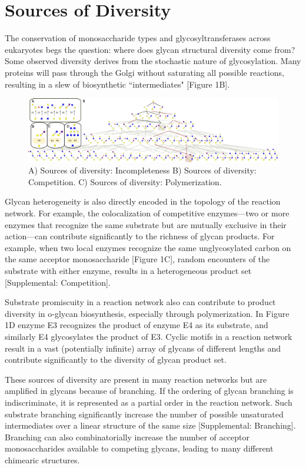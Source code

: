 \documentclass[twocolumn]{article}
\begin{document}
\section*{Sources of Diversity}
The conservation of monosaccharide types and glycosyltransferases across eukaryotes begs the question: where does glycan structural diversity come from? Some observed diversity derives from the stochastic nature of glycosylation.  Many proteins will pass through the Golgi without saturating all possible reactions, resulting in a slew of biosynthetic ``intermediates" [Figure 1B].  

\begin{figure}
    \includegraphics[width=\textwidth]{Figure_2.pdf}
	\caption{A) Sources of diversity: Incompleteness B) Sources of diversity: Competition. C) Sources of diversity: Polymerization.}
\end{figure}

Glycan heterogeneity is also directly encoded in the topology of the reaction network. For example, the colocalization of competitive enzymes---two or more enzymes that recognize the same substrate but are mutually exclusive in their action---can contribute significantly to the richness of glycan products. For example, when two local enzymes recognize the same unglycosylated carbon on the same acceptor monosaccharide [Figure 1C],  random encounters of the substrate with either enzyme, results in a heterogeneous product set [Supplemental: Competition].

Substrate promiscuity in a reaction network also can contribute to product diversity in o-glycan biosynthesis, especially through polymerization. In Figure 1D enzyme E3 recognizes the product of enzyme E4 as its substrate, and similarly E4 glycosylates the product of E3. Cyclic motifs in a reaction network result in a vast (potentially infinite) array of glycans of different lengths and contribute significantly to the diversity of glycan product set. 

These sources of diversity are present in many reaction networks but are amplified in glycans because of branching. If the ordering of glycan branching is indiscriminate, it is represented as a partial order in the reaction network. Such substrate branching significantly increase the number of possible unsaturated intermediates over a linear structure of the same size [Supplemental: Branching]. Branching can also combinatorially increase the number of acceptor monosaccharides available to competing glycans, leading to many different chimearic structures.\\ 
\end{document}
